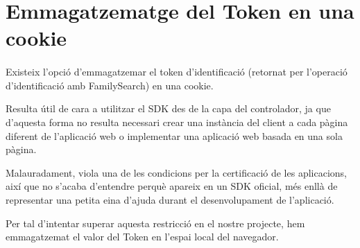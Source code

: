 \section{Emmagatzematge del Token en una cookie}

    \paragraph{}
    Existeix l'opció d'emmagatzemar el token d'identificació (retornat per l’operació d'identificació amb FamilySearch) en una cookie.

    Resulta útil de cara a utilitzar el SDK des de la capa del controlador, ja que d’aquesta forma no resulta necessari crear una instància del client a cada pàgina diferent de l’aplicació web o implementar una aplicació web basada en una sola pàgina.

    Malauradament, viola una de les condicions per la certificació de les aplicacions, així que no s'acaba d'entendre perquè apareix en un SDK oficial, més enllà de re\-pre\-sen\-tar una petita eina d'ajuda durant el desenvolupament de l'aplicació.

    Per tal d'intentar superar aquesta restricció en el nostre projecte, hem emmagatzemat el valor del Token en l’espai local del navegador.
